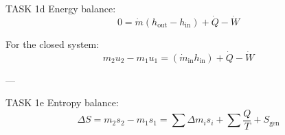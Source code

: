 TASK 1d  
Energy balance:  
\[
0 = \dot{m} \left( h_{\text{out}} - h_{\text{in}} \right) + \dot{Q} - \dot{W}
\]  

For the closed system:  
\[
m_2 u_2 - m_1 u_1 = \left( \dot{m}_{\text{in}} h_{\text{in}} \right) + \dot{Q} - \dot{W}
\]  

---

TASK 1e  
Entropy balance:  
\[
\Delta S = m_2 s_2 - m_1 s_1 = \sum \Delta m_i s_i + \sum \frac{Q}{T} + S_{\text{gen}}
\]
